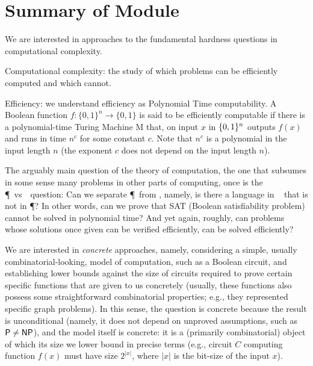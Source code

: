 %
%  
%
%






\section{Summary of Module}
\label{sec:1}

 We are interested in approaches to the fundamental hardness questions in computational complexity.

Computational complexity: the study of which problems can be efficiently computed and which cannot.

Efficiency: we understand efficiency as Polynomial Time computability. A Boolean function $f:\{0,1\}^n\to\{0,1\}$ is said to be efficiently computable if there is a polynomial-time Turing Machine M that, on input $x$ in $\{0,1\}^n$ outputs $f(x)$ and runs in time $n^c$ for some constant $c$. Note that $n^c$ is a polynomial in the input length $n$ (the exponent $c$ does not depend on the input length $n$). 

The arguably main question of the theory of computation, the one that subsumes in some sense many problems in other parts of computing, once is the \P~vs~\NP~question: Can we separate \P~from \NP, namely, is there a language in \NP~ that is not in \P? In other words, can we prove that SAT (Boolean satisfiability problem) cannot be solved in polynomial time? And yet again, roughly, can problems whose solutions once given can be verified efficiently, can be solved efficiently? 

We are interested in \emph{concrete} approaches, namely, considering a simple, usually combinatorial-looking, model of computation, such as a Boolean circuit, and establishing lower bounds against the size of circuits required to prove certain specific functions that are given to us concretely (usually, these functions also possess some straightforward combinatorial 
properties; e.g., they represented specific graph problems). In this sense, the question is concrete because the result is unconditional (namely, it does not depend on unproved 
assumptions, such as ${\mathsf{P}}\neq{\ensuremath{\mathsf{NP}}}$), and the model itself is concrete: it is a (primarily combinatorial) object of which its size we lower 
bound in precise terms (e.g., circuit $C$ computing function $f(x)$ must have size $2^{|x|}$, where $|x|$ is the bit-size of the input $x$).
\medskip 

